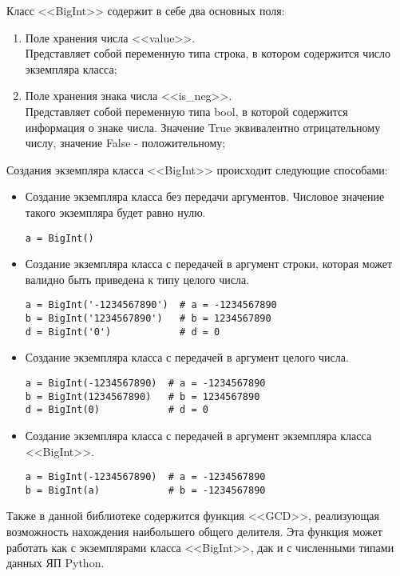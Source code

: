 Класс <<BigInt>> содержит в себе два основных поля:
\begin{enumerate}
    \item Поле хранения числа <<value>>.\\
    Представляет собой переменную типа строка, в котором содержится число экземпляра класса;
    \item Поле хранения знака числа <<is\_neg>>.\\
    Представляет собой переменную типа bool, в которой содержится информация о знаке числа.
    Значение True эквивалентно отрицательному числу, значение False - положительному;
\end{enumerate}

Создания экземпляра класса <<BigInt>> происходит следующие способами:
\begin{itemize}
    \item Создание экземпляра класса без передачи аргументов. Числовое значение такого экземпляра будет равно нулю.
    \begin{lstlisting}
a = BigInt()\end{lstlisting}
    \item Создание экземпляра класса с передачей в аргумент строки, которая может валидно быть приведена к типу целого числа.
    \begin{lstlisting}
a = BigInt('-1234567890')  # a = -1234567890
b = BigInt('1234567890')   # b = 1234567890
d = BigInt('0')            # d = 0\end{lstlisting}
    \item Создание экземпляра класса с передачей в аргумент целого числа.
    \begin{lstlisting}
a = BigInt(-1234567890)  # a = -1234567890
b = BigInt(1234567890)   # b = 1234567890
d = BigInt(0)            # d = 0\end{lstlisting}
    \item Создание экземпляра класса с передачей в аргумент экземпляра класса <<BigInt>>.
    \begin{lstlisting}
a = BigInt(-1234567890)  # a = -1234567890
b = BigInt(a)            # b = -1234567890\end{lstlisting}
\end{itemize}

Также в данной библиотеке содержится функция <<GCD>>, реализующая возможность нахождения наибольшего общего делителя.
Эта функция может работать как с экземплярами класса <<BigInt>>, дак и с численными типами данных ЯП Python.



